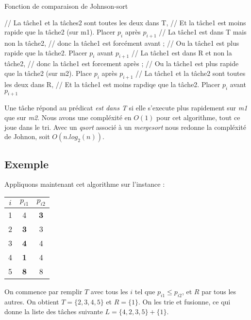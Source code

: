 \begin{algorithm}
\caption{Fonction de comparaison de Johnson-sort}
\begin{algorithmic}
		\STATE // La tâche1 et la tâches2 sont toutes les deux dans T,
		\STATE // Et la tâche1 est moins rapide que la tâche2 (sur m1).
		\STATE Placer $p_i$ après $p_{i+1}$
	\ELSE
		\STATE // La tâche1 est dans T mais non la tâche2,
		\STATE // donc la tâche1 est forcément avant ;
		\STATE // Ou la tâche1 est plus rapide que la tâche2.
		\STATE Placer $p_i$ avant $p_{i+1}$
	\ENDIF
\ELSE
		\STATE // La tâche1 est dans R et non la tâche2,
		\STATE // donc la tâche1 est forcement après ;
		\STATE // Ou la tâche1 est plus rapide que la tâche2 (sur m2).
		\STATE Place $p_i$ après $p_{i+1}$
	\ELSE
		\STATE // La tâche1 et la tâche2 sont toutes les deux dans R,
		\STATE // Et la tâche1 est moins rapdiqe que la tâche2.
		\STATE Placer $p_i$ avant $p_{i+1}$
	\ENDIF
\ENDIF
\end{algorithmic}
\end{algorithm}

Une tâche répond au prédicat {\em est dans T} si elle s'execute plus rapidement
sur {\em m1} que sur {\em m2}.
Nous avons une compléxité en $O(1)$ pour cet algorithme, tout ce joue dans le
tri. Avec un {\em qsort} associé à un {\em mergesort} nous redonne la compléxité
de Johnon, soit $O(n.log_2(n))$.


\subsection{Exemple}
Appliquons maintenant cet algorithme sur l'instance :

\begin{center}
\begin{tabular}{|c|c|c|}
\hline
$i$ & $p_{i1}$ & $p_{i2}$ \\
\hline
1 & 4 & \textbf{3} \\
\hline
2 & \textbf{3} & 3 \\
\hline
3 & \textbf{4} & 4 \\
\hline
4 & \textbf{1} & 4 \\
\hline
5 & \textbf{8} & 8 \\
\hline
\end{tabular}
\end{center}

On commence par remplir $T$ avec tous les $i$ tel que $p_{i1} \le p_{i2}$, et
$R$ par tous les autres.
On obtient $T = \{2,3,4,5\}$ et $R = \{1\}$.
On les trie et fusionne, ce qui donne la liste des tâches 
suivante $L = \{4,2,3,5\} + \{1\}$.
